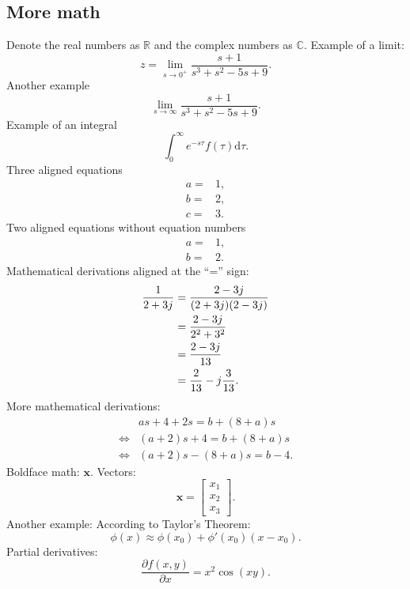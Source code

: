 \documentclass[a4paper,11pt,reqno]{amsart}
\newcommand{\R}{\mathbb{R}}
\newcommand{\C}{\mathbb{C}}
\newcommand{\dd}{\mathrm{d}}
\begin{document}
\subsection{More math} Denote the real numbers as $\R$ and the complex numbers
as $\C$. Example of a limit:
\begin{equation}
    z = \lim_{s\to0^+}\frac{s+1}{s^3+s^2-5s+9}.
\end{equation}
Another example
\begin{equation}
    \lim_{s\to\infty} \frac{s+1}{s^3+s^2-5s+9}.
\end{equation}
Example of an integral
\begin{equation}
    \int_0^\infty e^{-s\tau}f(\tau)\dd\tau.
\end{equation}
Three aligned equations
\begin{align}
    a =& 1,
    \\
    b =& 2,
    \\
    c =& 3.
\end{align}
Two aligned equations without equation numbers
\begin{align*}
    a =& 1,
    \\
    b =& 2.
\end{align*}
Mathematical derivations aligned at the ``='' sign:
\begin{align}
    \frac{1}{2+3j} {}={}& \frac{2-3j}{(2+3j)(2-3j)}
    \notag\\
    {}={}& \frac{2-3j}{2^2 + 3^2}
    \notag\\
    {}={}& \frac{2-3j}{13}
    \notag\\
    {}={}&\frac{2}{13} - j\frac{3}{13}.
\end{align}
More mathematical derivations:
\begin{align*}
 & as + 4 + 2s = b + (8+a)s
\\
 \Leftrightarrow{}& (a+2)s + 4 = b + (8+a)s
\\
 \Leftrightarrow{}& (a+2)s - (8+a)s = b - 4.
\end{align*}
Boldface math: $\bm{x}$. Vectors:
\begin{equation}
\bm{x} = 
    \begin{bmatrix}
    x_1
    \\
    x_2
    \\
    x_3
    \end{bmatrix}.
\end{equation}
Another example: According to Taylor's Theorem:
\begin{equation}
    \phi(x) \approx \phi(x_0) + \phi'(x_0)(x-x_0).
\end{equation}
Partial derivatives:
\begin{equation}
 \label{eq:partial_derivatives}
 \frac{\partial f(x, y)}{\partial x} = x^2\cos(xy).
\end{equation}
\end{document}
